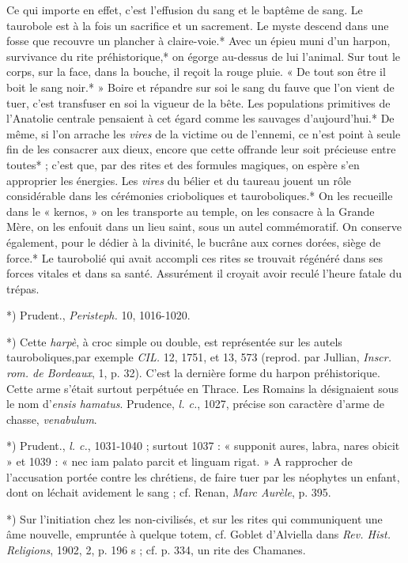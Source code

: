 \documentclass[a4paper, 11pt, oneside, polutonikogreek, french]{article}
\begin{document}
Ce qui importe en effet, c'est l'effusion du sang et le baptême de sang. Le taurobole est à la fois un sacrifice et un sacrement. Le myste descend dans une fosse que recouvre un plancher à claire-voie.* Avec un épieu muni d'un harpon, survivance du rite préhistorique,* on égorge au-dessus de lui l'animal. Sur tout le corps, sur la face, dans la bouche, il reçoit la rouge pluie. « De tout son être il boit le sang noir.* » Boire et répandre sur soi le sang du fauve que l'on vient de tuer, c'est transfuser en soi la vigueur de la bête. Les populations primitives de l'Anatolie centrale pensaient à cet égard comme les sauvages d'aujourd'hui.* De même, si l'on arrache les \emph{vires} de la victime ou de l'ennemi, ce n'est point à seule fin de les consacrer aux dieux, encore que cette offrande leur soit précieuse entre toutes* ; c'est que, par des rites et des formules magiques, on espère s'en approprier les énergies. Les \emph{vires} du bélier et du taureau jouent un rôle considérable dans les cérémonies crioboliques et tauroboliques.* On les recueille dans le « kernos, » on les transporte au temple, on les consacre à la Grande Mère, on les enfouit dans un lieu saint, sous un autel commémoratif. On conserve également, pour le dédier à la divinité, le bucrâne aux cornes dorées, siège de force.* Le taurobolié qui avait accompli ces rites se trouvait régénéré dans ses forces vitales et dans sa santé. Assurément il croyait avoir reculé l'heure fatale du trépas.

*) Prudent., \emph{Peristeph.} 10, 1016-1020.

*) Cette \emph{harpè}, à croc simple ou double, est représentée sur les autels tauroboliques,par exemple \emph{CIL.} 12, 1751, et 13, 573 (reprod. par Jullian, \emph{Inscr. rom. de Bordeaux}, 1, p. 32). C'est la dernière forme du harpon préhistorique. Cette arme s'était surtout perpétuée en Thrace. Les Romains la désignaient sous le nom d'\emph{ensis hamatus}. Prudence, \emph{l. c.}, 1027, précise son caractère d'arme de chasse, \emph{venabulum}.

*) Prudent., \emph{l. c.}, 1031-1040 ; surtout 1037 : « supponit aures, labra, nares obicit » et 1039 : « nec iam palato parcit et linguam rigat. » A rapprocher de l'accusation portée contre les chrétiens, de faire tuer par les néophytes un enfant, dont on léchait avidement le sang ; cf. Renan, \emph{Marc Aurèle}, p. 395.

*) Sur l'initiation chez les non-civilisés, et sur les rites qui communiquent une âme nouvelle, empruntée à quelque totem, cf. Goblet d'Alviella dans \emph{Rev. Hist. Religions}, 1902, 2, p. 196 s ; cf. p. 334, un rite des Chamanes.
\end{document}
